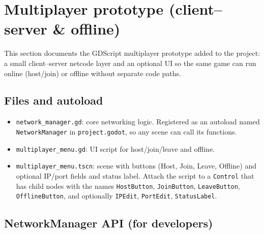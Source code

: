 \documentclass{article}
\begin{document}
\newpage

\section*{Multiplayer prototype (client--server \& offline)}

This section documents the GDScript multiplayer prototype added to the
project: a small client--server netcode layer and an optional UI so the
same game can run online (host/join) or offline without separate code
paths.

\subsection*{Files and autoload}

\begin{itemize}
  \item \texttt{network\_manager.gd}: core networking logic. Registered
    as an autoload named \texttt{NetworkManager} in
    \texttt{project.godot}, so any scene can call its functions.
  \item \texttt{multiplayer\_menu.gd}: UI script for host/join/leave and
    offline.
  \item \texttt{multiplayer\_menu.tscn}: scene with buttons (Host, Join,
    Leave, Offline) and optional IP/port fields and status label. Attach
    the script to a \texttt{Control} that has child nodes with the
    names \texttt{HostButton}, \texttt{JoinButton}, \texttt{LeaveButton},
    \texttt{OfflineButton}, and optionally \texttt{IPEdit},
    \texttt{PortEdit}, \texttt{StatusLabel}.
\end{itemize}

\subsection*{NetworkManager API (for developers)}
\end{document}
